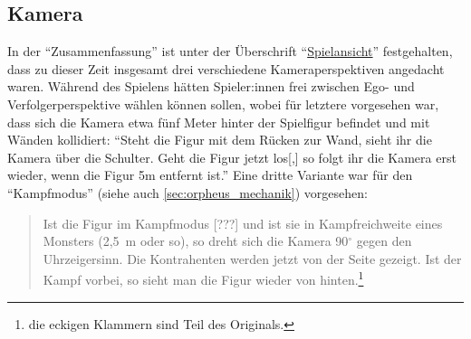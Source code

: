 \documentclass[a5paper,pagesize,numbers=noenddot]{scrbook}
\begin{document}
\subsection{Kamera}\label{sec:orpheus_darstellung_kamera}
In der \enquote{Zusammenfassung} ist unter der Überschrift \enquote{\uline{Spielansicht}} festgehalten, dass zu dieser Zeit insgesamt drei verschiedene Kameraperspektiven angedacht waren.
Während des Spielens hätten Spieler:innen frei zwischen Ego- und Verfolgerperspektive wählen können sollen, wobei für letztere vorgesehen war, dass sich die Kamera etwa fünf Meter hinter der Spielfigur befindet und mit Wänden kollidiert:
\enquote{Steht die Figur mit dem Rücken zur Wand, sieht ihr die Kamera über die Schulter. Geht die Figur jetzt los[,] so folgt ihr die Kamera erst wieder, wenn die Figur 5m entfernt ist.}\autocite[S.~1]{orpheus_zusammenfassung_1996}
Eine dritte Variante war für den \enquote{Kampfmodus} (siehe auch \autoref{sec:orpheus_mechanik}) vorgesehen:

\begin{quote}
   Ist die Figur im Kampfmodus [???] und ist sie in Kampfreichweite eines Monsters (2,5~m oder so), so dreht sich die Kamera 90$^\circ$ gegen den Uhrzeigersinn.
   Die Kontrahenten werden jetzt von der Seite gezeigt.
   Ist der Kampf vorbei, so sieht man die Figur wieder von hinten.\footnote{\autocite[S.~1;]{orpheus_zusammenfassung_1996} die eckigen Klammern sind Teil des Originals.}
\end{quote}


\end{document}
